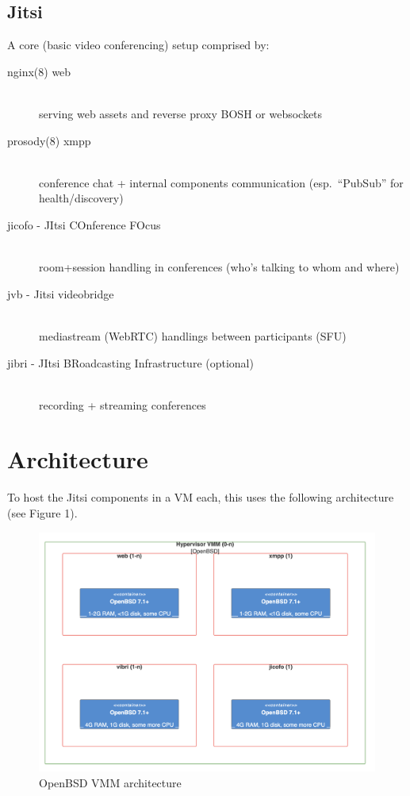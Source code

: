 \documentclass[10pt,conference]{IEEEtran}
\begin{document}
\subsection{Jitsi}
A core (basic video conferencing) setup comprised by:
\begin{description}
\item[nginx(8) web] \hfill \\
	serving web assets and reverse proxy BOSH or websockets
\item[prosody(8) xmpp] \hfill \\
	conference chat + internal components communication (esp. “PubSub” for health/discovery)
\item[jicofo - JItsi COnference FOcus] \hfill \\
	room+session handling in conferences (who’s talking to whom and where)
\item[jvb - Jitsi videobridge] \hfill \\
	mediastream (WebRTC) handlings between participants (SFU)
\item[jibri - JItsi BRoadcasting Infrastructure (optional)] \hfill \\
	recording + streaming conferences
\end{description}

\section{Architecture}
To host the Jitsi components in a VM each, this uses the following architecture (see Figure 1).
\begin{figure}
    \centering
    \includegraphics[width=16cm]{img/arch-openbsd.png}
    \caption{\textsf{OpenBSD VMM architecture}}
\end{figure}
\end{document}
